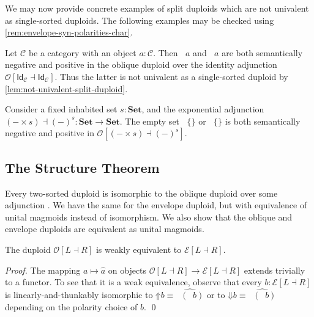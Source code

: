 \documentclass[runningheads]{llncs}
\newcommand*\rocqlogo{\usebox{\rocqlogobox}}
\newcommand{\lemmaref}[3]{\href{https://github.com/UniMath/UniMath/blob/94fae0eda57a778cec704bfa73b4ff525c9bc475/#1\#L#2?name=#3}{\rocqlogo}}
\newcommand{\acat}[1]{\mathcal{#1}}
\newcommand{\C}{\acat{C}}
\newcommand{\OO}{\acat{O}}
\newcommand{\EE}{\acat{E}}
\newcommand{\wkcat}[1]{\mathbf{#1}}
\newcommand{\Setcat}{\wkcat{Set}}
\newcommand{\Obl}[1]{\OO[#1]}
\newcommand{\Env}[1]{\EE[#1]}
\newcommand{\Id}{\mathsf{Id}}
\newcommand{\upshift}{\mathord{\Uparrow}}
\newcommand{\downshift}{\mathord{\Downarrow}}
\newcommand{\inneg}{\mathop{\iota^{\ominus}}}
\newcommand{\inpos}{\mathop{\iota^{\oplus}}}
\newcommand{\projneg}{\mathop{\pi^{\ominus}}}
\newcommand{\projpos}{\mathop{\pi^{\oplus}}}
\begin{document}
We may now provide concrete examples of split duploids which are not
univalent as single\hyp{}sorted duploids. The following examples may be checked
using \autoref{rem:envelope-syn-polarities-char}.

\begin{exampledef}
\label{ex:oblique-nonunivalent-1}
Let \(\C\) be a category with an object \(a : \C\). Then \(\inneg{a}\)
and \(\inpos{a}\) are both semantically negative and positive in the
oblique duploid over the identity adjunction \(\Obl{\Id_{\C} \dashv
\Id_{\C}}\). Thus the latter is not univalent as a single\hyp{}sorted
duploid by \autoref{lem:not-univalent-split-duploid}.
\end{exampledef}

\begin{exampledef}
Consider a fixed inhabited set \(s : \Setcat\), and the exponential adjunction
\((-\times s) \dashv (-)^{\displaystyle s} : \Setcat \to \Setcat\). The
empty set \(\inneg\{\}\) or \(\inpos\{\}\) is both semantically negative and positive
in \(\Obl{(-\times s) \dashv (-)^{\displaystyle s}}\).
\end{exampledef}
\subsection{The Structure Theorem}
\label{sec:structure-thm}
Every two\hyp{}sorted duploid is isomorphic to the oblique duploid over
some adjunction \cite[Proposition II.35]{MunchMaccagnoni13}. We have
the same for the envelope duploid, but with equivalence of unital
magmoids instead of isomorphism. We also show that the oblique and
envelope duploids are equivalent as unital magmoids.

\begin{theorem}[{\lemmaref{UniMath/CategoryTheory/Nonassociative/Duploids/FromAdjunction/Oblique.v}{281}{oblique\_to\_envelope}}]
\label{lem:weak-equivalence}
The duploid \(\Obl{L \dashv R}\) is weakly equivalent to \(\Env{L \dashv R}\).
\end{theorem}
\begin{proof}
The mapping \(a \mapsto \widehat{a}\) on objects \(\Obl{L \dashv R}
\to \Env{L \dashv R}\) extends trivially to a functor. To see that it
is a weak equivalence, observe that every \(b : \Env{L \dashv R}\) is
linearly\hyp{}and\hyp{}thunkably isomorphic to \(\upshift{b} \equiv
\widehat{\inpos(\projpos{b})}\) or to \(\downshift{b} \equiv
\widehat{\inpos(\projneg{b})}\) depending on the polarity choice of
\(b\).
\qed
\end{proof}
\end{document}
